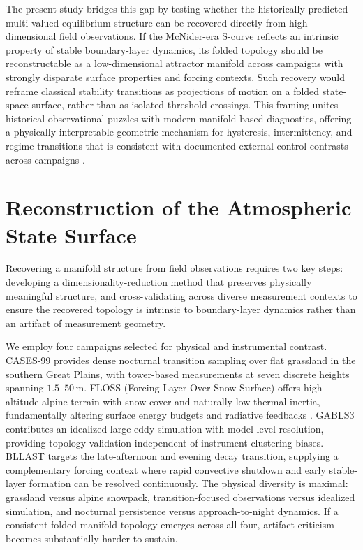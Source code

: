 \documentclass[12pt,a4paper]{article}
\begin{document}
The present study bridges this gap by testing whether the historically predicted multi-valued equilibrium structure can be recovered directly from high-dimensional field observations. If the McNider-era S-curve reflects an intrinsic property of stable boundary-layer dynamics, its folded topology should be reconstructable as a low-dimensional attractor manifold across campaigns with strongly disparate surface properties and forcing contexts. Such recovery would reframe classical stability transitions as projections of motion on a folded state-space surface, rather than as isolated threshold crossings. This framing unites historical observational puzzles with modern manifold-based diagnostics, offering a physically interpretable geometric mechanism for hysteresis, intermittency, and regime transitions that is consistent with documented external-control contrasts across campaigns \citep{acevedo2021external}.

\section{Reconstruction of the Atmospheric State Surface}

Recovering a manifold structure from field observations requires two key steps: developing a dimensionality-reduction method that preserves physically meaningful structure, and cross-validating across diverse measurement contexts to ensure the recovered topology is intrinsic to boundary-layer dynamics rather than an artifact of measurement geometry.

We employ four campaigns selected for physical and instrumental contrast. CASES-99 \citep{poulos2002} provides dense nocturnal transition sampling over flat grassland in the southern Great Plains, with tower-based measurements at seven discrete heights spanning $1.5\text{--}50\,\mathrm{m}$. FLOSS (Forcing Layer Over Snow Surface) offers high-altitude alpine terrain with snow cover and naturally low thermal inertia, fundamentally altering surface energy budgets and radiative feedbacks \citep{acevedo2021external}. GABLS3 \citep{beare2004} contributes an idealized large-eddy simulation with model-level resolution, providing topology validation independent of instrument clustering biases. BLLAST targets the late-afternoon and evening decay transition, supplying a complementary forcing context where rapid convective shutdown and early stable-layer formation can be resolved continuously. The physical diversity is maximal: grassland versus alpine snowpack, transition-focused observations versus idealized simulation, and nocturnal persistence versus approach-to-night dynamics. If a consistent folded manifold topology emerges across all four, artifact criticism becomes substantially harder to sustain.
\end{document}
